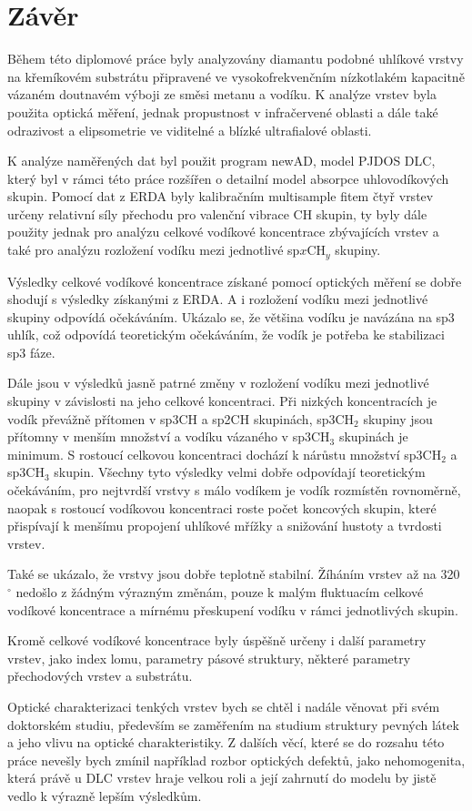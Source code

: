 \chapter*{Závěr}

Během této diplomové práce byly analyzovány diamantu podobné uhlíkové vrstvy na křemíkovém substrátu připravené ve vysokofrekvenčním nízkotlakém kapacitně vázaném doutnavém výboji ze směsi metanu a vodíku. K analýze vrstev byla použita optická měření, jednak propustnost v infračervené oblasti a dále také odrazivost a elipsometrie ve viditelné a blízké ultrafialové oblasti.

K analýze naměřených dat byl použit program newAD, model PJDOS DLC, který byl v rámci této práce rozšířen o detailní model absorpce uhlovodíkových skupin. Pomocí dat z ERDA byly kalibračním multisample fitem čtyř vrstev určeny relativní síly přechodu pro valenční vibrace CH skupin, ty byly dále použity jednak pro analýzu celkové vodíkové koncentrace zbývajících vrstev a také pro analýzu rozložení vodíku mezi jednotlivé sp$x$CH$_y$ skupiny. 

Výsledky celkové vodíkové koncentrace získané pomocí optických měření se dobře shodují s výsledky získanými z ERDA. A i rozložení vodíku mezi jednotlivé skupiny odpovídá očekáváním. Ukázalo se, že většina vodíku je navázána na sp3 uhlík, což odpovídá teoretickým očekáváním, že vodík je potřeba ke stabilizaci sp3 fáze.

Dále jsou v výsledků jasně patrné změny v rozložení vodíku mezi jednotlivé skupiny v závislosti na jeho celkové koncentraci. Při nizkých koncentracích je vodík převážně přítomen v sp3CH a sp2CH skupinách, sp3CH$_2$ skupiny jsou přítomny v menším množství a vodíku vázaného v sp3CH$_3$ skupinách je minimum. S rostoucí celkovou koncentraci dochází k nárůstu množství sp3CH$_2$ a sp3CH$_3$ skupin. Všechny tyto výsledky velmi dobře odpovídají teoretickým očekáváním, pro nejtvrdší vrstvy s málo vodíkem je vodík rozmístěn rovnoměrně, naopak s rostoucí vodíkovou koncentraci roste počet koncových skupin, které přispívají k menšímu propojení uhlíkové mřížky a snižování hustoty a tvrdosti vrstev.

Také se ukázalo, že vrstvy jsou dobře teplotně stabilní. Žíháním vrstev až na 320\,$^\circ$ nedošlo z žádným výrazným změnám, pouze k malým fluktuacím celkové vodíkové koncentrace a mírnému přeskupení vodíku v rámci jednotlivých skupin.

Kromě celkové vodíkové koncentrace byly úspěšně určeny i další parametry vrstev, jako index lomu, parametry pásové struktury, některé parametry přechodových vrstev a substrátu.

Optické charakterizaci tenkých vrstev bych se chtěl i nadále věnovat při svém doktorském studiu, především se zaměřením na studium struktury pevných látek a jeho vlivu na optické charakteristiky. Z dalších věcí, které se do rozsahu této práce nevešly bych zmínil například rozbor optických defektů, jako nehomogenita, která právě u DLC vrstev hraje velkou roli a její zahrnutí do modelu by jistě vedlo k výrazně lepším výsledkům.

\cleardoublepage
